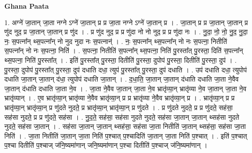 \documentclass[17pt]{extarticle}
\begin{document}
\textbf{Ghana Paata } \newline

1. अग्ने॑ जा॒तान् जा॒ता नग्ने ऽग्ने॑ जा॒तान् प्र प्र जा॒ता नग्ने ऽग्ने॑ जा॒तान् प्र । . जा॒तान् प्र प्र जा॒तान् जा॒तान् प्र णु॑द नुद॒ प्र जा॒तान् जा॒तान् प्र णु॑द । . प्र णु॑द नुद॒ प्र प्र णु॑दा नो नो नुद॒ प्र प्र णु॑दा नः । . नु॒दा॒ नो॒ नो॒ नु॒द॒ नु॒दा॒ नः॒ स॒पत्ना᳚न् थ्स॒पत्ना᳚न् नो नुद नुदा नः स॒पत्नान्॑ । . नः॒ स॒पत्ना᳚न् थ्स॒पत्ना᳚न् नो नः स॒पत्ना॒ नितीति॑ स॒पत्ना᳚न् नो नः स॒पत्ना॒ निति॑ । . स॒पत्ना॒ नितीति॑ स॒पत्ना᳚न् थ्स॒पत्ना॒ निति॑ पु॒रस्ता᳚त् पु॒रस्ता॒ दिति॑ स॒पत्ना᳚न् थ्स॒पत्ना॒ निति॑ पु॒रस्ता᳚त् । . इति॑ पु॒रस्ता᳚त् पु॒रस्ता॒ दितीति॑ पु॒रस्ता॒ दुपोप॑ पु॒रस्ता॒ दितीति॑ पु॒रस्ता॒ दुप॑ । . पु॒रस्ता॒ दुपोप॑ पु॒रस्ता᳚त् पु॒रस्ता॒ दुप॑ दधाति दधा॒ त्युप॑ पु॒रस्ता᳚त् पु॒रस्ता॒ दुप॑ दधाति । . उप॑ दधाति दधा॒ त्युपोप॑ दधाति जा॒तान् जा॒तान् द॑धा॒ त्युपोप॑ दधाति जा॒तान् । . द॒धा॒ति॒ जा॒तान् जा॒तान् द॑धाति दधाति जा॒ता ने॒वैव जा॒तान् द॑धाति दधाति जा॒ता ने॒व । . जा॒ता ने॒वैव जा॒तान् जा॒ता ने॒व भ्रातृ॑व्या॒न् भ्रातृ॑व्या ने॒व जा॒तान् जा॒ता ने॒व भ्रातृ॑व्यान् । . ए॒व भ्रातृ॑व्या॒न् भ्रातृ॑व्या ने॒वैव भ्रातृ॑व्या॒न् प्र प्र भ्रातृ॑व्या ने॒वैव भ्रातृ॑व्या॒न् प्र । . भ्रातृ॑व्या॒न् प्र प्र भ्रातृ॑व्या॒न् भ्रातृ॑व्या॒न् प्र णु॑दते नुदते॒ प्र भ्रातृ॑व्या॒न् भ्रातृ॑व्या॒न् प्र णु॑दते । . प्र णु॑दते नुदते॒ प्र प्र णु॑दते॒ सह॑सा॒ सह॑सा नुदते॒ प्र प्र णु॑दते॒ सह॑सा । . नु॒द॒ते॒ सह॑सा॒ सह॑सा नुदते नुदते॒ सह॑सा जा॒तान् जा॒तान् थ्सह॑सा नुदते नुदते॒ सह॑सा जा॒तान् । . सह॑सा जा॒तान् जा॒तान् थ्सह॑सा॒ सह॑सा जा॒ता नितीति॑ जा॒तान् थ्सह॑सा॒ सह॑सा जा॒ता निति॑ । . जा॒ता नितीति॑ जा॒तान् जा॒ता निति॑ प॒श्चात् प॒श्चादिति॑ जा॒तान् जा॒ता निति॑ प॒श्चात् । . इति॑ प॒श्चात् प॒श्चा दितीति॑ प॒श्चाज् ज॑नि॒ष्यमा॑णान् जनि॒ष्यमा॑णान् प॒श्चा दितीति॑ प॒श्चाज् ज॑नि॒ष्यमा॑णान् । \newline
\end{document}
